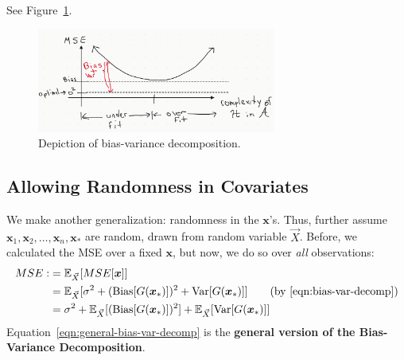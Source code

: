 \documentclass[12pt, a4paper]{article}
\theoremstyle{definition}
\begin{document}
	See Figure~\ref{fig:bias-variance-tradeoff}.
	\begin{figure}
		\centering
		\includegraphics[width=0.7\textwidth]{bias-variance-tradeoff}
		\caption{Depiction of bias-variance decomposition.}
		\label{fig:bias-variance-tradeoff}
	\end{figure}
	\subsection*{Allowing Randomness in Covariates}
	We make another generalization: randomness in the $\bm{x}$'s. Thus,
	further assume $\bm{x}_1,\bm{x}_2,\ldots,\bm{x}_n,\bm{x}_*$ are random,
	drawn from random variable $\vec{X}$. Before, we calculated the MSE
	over a fixed $\bm{x}$, but now, we do so over \textit{all} observations:
	\begin{align}
		MSE :
		&= \mathbb{E}_{\vec{X}}[MSE[\bm{x}]]\nonumber\\
		&= \mathbb{E}_{\vec{X}}[\sigma^2 + (\text{Bias}[G(\bm{x}_*)])^2 + \text{Var}[G(\bm{x}_*)]]\nonumber
		\tag{by \ref{eqn:bias-var-decomp}}\\
		&=\sigma^2 + \mathbb{E}_{\vec{X}}[(\text{Bias}[G(\bm{x}_*)])^2]
		+ \mathbb{E}_{\vec{X}}[\text{Var}[G(\bm{x}_*)]]
		\label{eqn:general-bias-var-decomp}
	\end{align}
	Equation~\ref{eqn:general-bias-var-decomp} is the \textbf{general version of
	the Bias-Variance Decomposition}.
	
\end{document}
